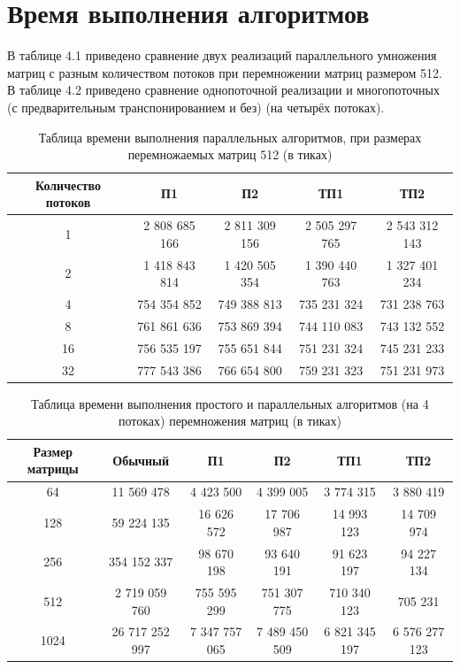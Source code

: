 \documentclass[12pt]{report}
\begin{document}
\section{Время выполнения алгоритмов}
В таблице 4.1 приведено сравнение двух реализаций параллельного умножения матриц с разным количеством потоков при перемножении матриц размером 512. В таблице 4.2 приведено сравнение однопоточной реализации и многопоточных (с предварительным транспонированием и без) (на четырёх потоках).

\begin{table} [h!]
	\caption{Таблица времени выполнения параллельных алгоритмов, при размерах перемножаемых матриц 512 (в тиках)}
	\begin{center}
		\begin{tabular}{|c c c c c|} 
			\hline
			Количество потоков & П1 & П2 & ТП1 & ТП2 \\  
			\hline
			1 & 2 808 685 166 & 2 811 309 156 & 2 505 297 765 & 2 543 312 143\\
			\hline
			2 & 1 418 843 814 & 1 420 505 354 & 1 390 440 763 & 1 327 401 234\\
			\hline
			4 & 754 354 852 & 749 388 813 & 735 231 324 & 731 238 763 \\
			\hline
			8 & 761 861 636 & 753 869 394 & 744 110 083 & 743 132 552 \\
			\hline
			16 & 756 535 197 & 755 651 844 & 751 231 324 & 745 231 233 \\
			\hline
			32 & 777 543 386 & 766 654 800 & 759 231 323 & 751 231 973 \\
			\hline
		\end{tabular}
	\end{center}
\end{table}

\begin{table} [h!]
	\caption{Таблица времени выполнения простого и параллельных алгоритмов (на 4 потоках) перемножения матриц (в тиках)}
	\begin{center}
		\begin{tabular}{|c c c c c c|} 
			\hline
			Размер матрицы & Обычный & П1 & П2 & ТП1 & ТП2\\  
			\hline
			64 & 11 569 478 & 4 423 500 & 4 399 005 & 3 774 315 & 3 880 419 \\
			\hline
			128 & 59 224 135 & 16 626 572 & 17 706 987 & 14 993 123 & 14 709 974 \\
			\hline
			256 & 354 152 337 & 98 670 198 & 93 640 191 & 91 623 197 & 94 227 134 \\
			\hline
			512 & 2 719 059 760 & 755 595 299 & 751 307 775 & 710 340 123 & 705 231 \\
			\hline
			1024 & 26 717 252 997 & 7 347 757 065 & 7 489 450 509 & 6 821 345 197 & 6 576 277 123 \\
			\hline
		\end{tabular}
	\end{center}
\end{table}
\end{document}
